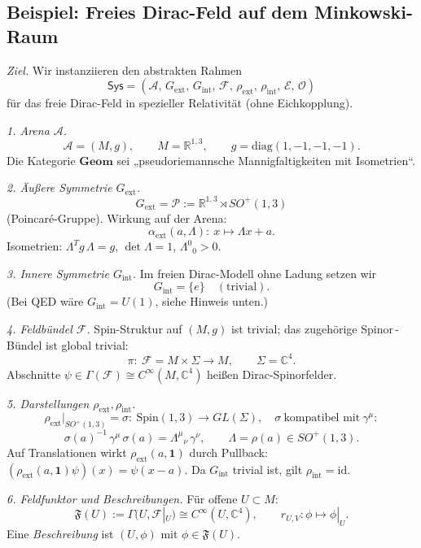 \documentclass[10pt, letterpaper]{article}
\newcommand{\R}{\mathbb{R}}
\newcommand{\C}{\mathbb{C}}
\newcommand{\Spin}{\mathrm{Spin}}
\begin{document}
\pagebreak


\subsection{Beispiel: Freies Dirac-Feld auf dem Minkowski-Raum}

\emph{Ziel.}
Wir instanziieren den abstrakten Rahmen
\[
\mathsf{Sys}=(\mathcal A,\,G_{\mathrm{ext}},\,G_{\mathrm{int}},\,\mathcal F,\,\rho_{\mathrm{ext}},\,\rho_{\mathrm{int}},\,\mathcal E,\,\mathcal O)
\]
für das freie Dirac-Feld in spezieller Relativität (ohne Eichkopplung).

\medskip
\emph{1. Arena \(\mathcal A\).}
\[
\mathcal A=(M,g),\qquad M=\R^{1,3},\qquad g=\mathrm{diag}(1,-1,-1,-1).
\]
Die Kategorie \(\mathbf{Geom}\) sei „pseudoriemannsche Mannigfaltigkeiten mit Isometrien“.

\medskip
\emph{2. Äußere Symmetrie \(G_{\mathrm{ext}}\).}
\[
G_{\mathrm{ext}}=\mathcal P:=\R^{1,3}\rtimes SO^+(1,3)
\]
(Poincaré-Gruppe). Wirkung auf der Arena:
\[
\alpha_{\mathrm{ext}}(a,\Lambda):\ x\mapsto \Lambda x + a.
\]
Isometrien: \(\Lambda^T g\,\Lambda=g\), \(\det\Lambda=1\), \(\Lambda^0{}_0>0\).

\medskip
\emph{3. Innere Symmetrie \(G_{\mathrm{int}}\).}
Im freien Dirac-Modell ohne Ladung setzen wir
\[
G_{\mathrm{int}}=\{e\}\quad(\text{trivial}).
\]
(Bei QED wäre \(G_{\mathrm{int}}=U(1)\), siehe Hinweis unten.)

\medskip
\emph{4. Feldbündel \(\mathcal F\).}
Spin-Struktur auf \((M,g)\) ist trivial; das zugehörige Spinor\,-\,Bündel ist global trivial:
\[
\pi:\ \mathcal F=M\times \Sigma \longrightarrow M,\qquad \Sigma=\C^4.
\]
Abschnitte \(\psi\in\Gamma(\mathcal F)\cong C^\infty(M,\C^4)\) heißen Dirac-Spinorfelder.

\medskip
\emph{5. Darstellungen \(\rho_{\mathrm{ext}},\rho_{\mathrm{int}}\).}
\[
\rho_{\mathrm{ext}}|_{SO^+(1,3)}=\sigma:\ \Spin(1,3)\to GL(\Sigma),
\quad \sigma\ \text{kompatibel mit}\ \gamma^\mu:
\]
\[
\sigma(a)^{-1}\,\gamma^\mu\,\sigma(a)=\Lambda^\mu{}_\nu\,\gamma^\nu,\qquad \Lambda=\rho(a)\in SO^+(1,3).
\]
Auf Translationen wirkt \(\rho_{\mathrm{ext}}(a,\mathbf 1)\) durch Pullback:
\((\rho_{\mathrm{ext}}(a,\mathbf 1)\psi)(x)=\psi(x-a)\).
Da \(G_{\mathrm{int}}\) trivial ist, gilt \(\rho_{\mathrm{int}}=\mathrm{id}\).

\medskip
\emph{6. Feldfunktor und Beschreibungen.}
Für offene \(U\subset M\):
\[
\mathfrak F(U):=\Gamma(U,\mathcal F|_U)\cong C^\infty(U,\C^4),\qquad
r_{U,V}:\phi\mapsto \phi|_U.
\]
Eine \emph{Beschreibung} ist \((U,\phi)\) mit \(\phi\in \mathfrak F(U)\).
\end{document}
